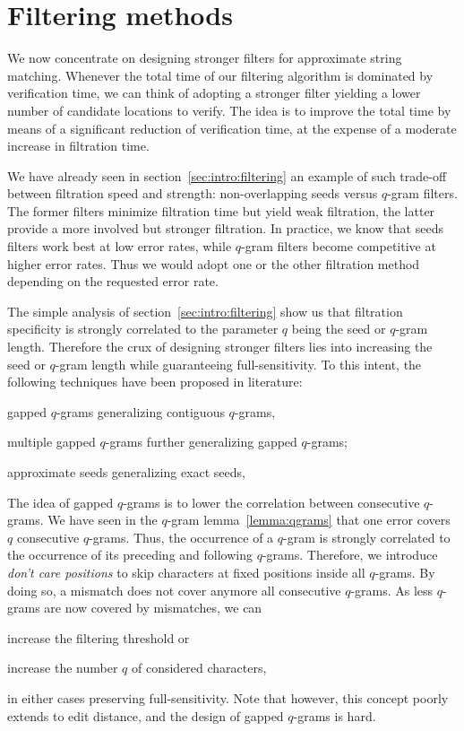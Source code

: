 \chapter{Filtering methods}

We now concentrate on designing stronger filters for approximate string matching.
Whenever the total time of our filtering algorithm is dominated by verification time, we can think of adopting a stronger filter yielding a lower number of candidate locations to verify.
The idea is to improve the total time by means of a significant reduction of verification time, at the expense of a moderate increase in filtration time.

We have already seen in section~\ref{sec:intro:filtering} an example of such trade-off between filtration speed and strength: non-overlapping seeds versus $q$-gram filters.
The former filters minimize filtration time but yield weak filtration, the latter provide a more involved but stronger filtration.
In practice, we know that seeds filters work best at low error rates, while $q$-gram filters become competitive at higher error rates.
Thus we would adopt one or the other filtration method depending on the requested error rate.

The simple analysis of section~\ref{sec:intro:filtering} show us that filtration specificity is strongly correlated to the parameter $q$ being the seed or $q$-gram length.
Therefore the crux of designing stronger filters lies into increasing the seed or $q$-gram length while guaranteeing full-sensitivity.
To this intent, the following techniques have been proposed in literature:
\begin{inparaenum}[(i)]
\item gapped $q$-grams generalizing contiguous $q$-grams,
\item multiple gapped $q$-grams further generalizing gapped $q$-grams;
\item approximate seeds generalizing exact seeds,
\end{inparaenum}

The idea of gapped $q$-grams is to lower the correlation between consecutive $q$-grams.
We have seen in the $q$-gram lemma~\ref{lemma:qgrams} that one error covers $q$ consecutive $q$-grams.
Thus, the occurrence of a $q$-gram is strongly correlated to the occurrence of its preceding and following $q$-grams.
Therefore, we introduce \emph{don't care positions} to skip characters at fixed positions inside all $q$-grams.
By doing so, a mismatch does not cover anymore all consecutive $q$-grams.
As less $q$-grams are now covered by mismatches, we can
\begin{inparaenum}[(i)]
\item increase the filtering threshold or
\item increase the number $q$ of considered characters,
\end{inparaenum}
in either cases preserving full-sensitivity.
Note that however, this concept poorly extends to edit distance, and the design of gapped $q$-grams is hard.

